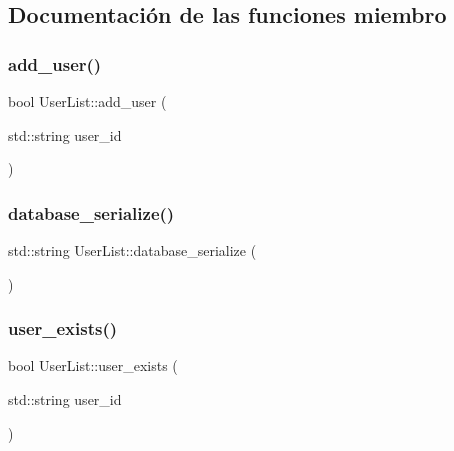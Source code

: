 \subsection{Documentación de las funciones miembro}
\mbox{\label{classUserList_a05ea1e97481b354b09fc7b2d958ab3f0}} 
\subsubsection{\texorpdfstring{add\+\_\+user()}{add\_user()}}
{\footnotesize\ttfamily bool User\+List\+::add\+\_\+user (\begin{DoxyParamCaption}\item[{std\+::string}]{user\+\_\+id }\end{DoxyParamCaption})}

\mbox{\label{classUserList_ab65c0e619e9c870f58a8b5cb91cd9bdf}} 
\subsubsection{\texorpdfstring{database\+\_\+serialize()}{database\_serialize()}}
{\footnotesize\ttfamily std\+::string User\+List\+::database\+\_\+serialize (\begin{DoxyParamCaption}{ }\end{DoxyParamCaption})}

\mbox{\label{classUserList_af0915199f9d94fdbb2d977d1641338e2}} 
\subsubsection{\texorpdfstring{user\+\_\+exists()}{user\_exists()}}
{\footnotesize\ttfamily bool User\+List\+::user\+\_\+exists (\begin{DoxyParamCaption}\item[{std\+::string}]{user\+\_\+id }\end{DoxyParamCaption})}

\mbox{\label{classUserList_a23770ac7a1e27d45d6cb738df1a66285}} 
